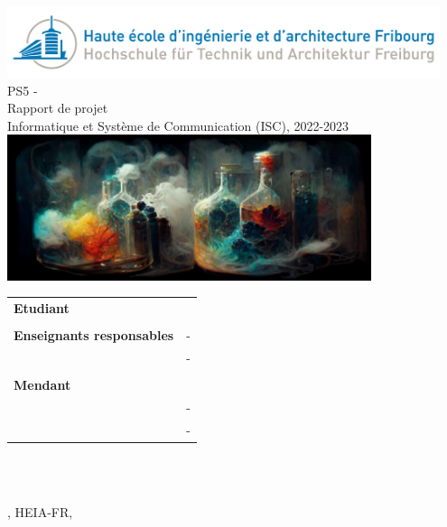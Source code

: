 
\begin{titlepage}
{\selectfont
    \begin{center}
	    \includegraphics[width=0.95\textwidth]{img/heiafr_logo}
		~\\[1.5cm]
		{
			\Huge
			PS5 - \ThesisTitle\\Rapport de projet \\[0.5cm]
			\large Informatique et Système de Communication (ISC), 2022-2023\\[2cm]
		}
		\includegraphics[width=0.8\textwidth]{img/logo.png}
		~\\[2cm]
		{
			\begin{center}
			\begin{tabularx}{\textwidth} { %
				>{\raggedright\arraybackslash}X 
				>{\raggedright\arraybackslash}X  }
					 \textbf{Etudiant} & \Author\\
					 & \\
					 \textbf{Enseignants responsables} & \Advisor \space - \AdvisorSchool \\ & \AdvisorTwo \space - \AdvisorTwoSchool \\
					 & \\
					 \textbf{Mendant} & \MendantInstitut \\ & \MendantOne \space - \MendantOneSchool \\ & \MendantTwo \space - \MendantTwoSchool\\
			\end{tabularx}
			\end{center}
			~\\[1.5cm]
		}

		\vfill
		
		 
		
	    {\projectVersion}\\
		{\large \Place, HEIA-FR, \Date}
		
	\end{center}
}
\restoregeometry
\end{titlepage}




